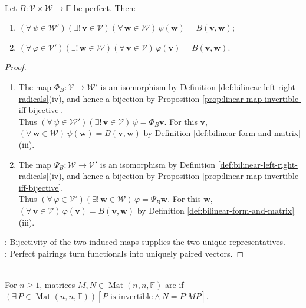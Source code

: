 \begin{corollary} \label{cor:perfect-pairing-represents-functionals} \\
Let $B:\mathcal{V}\times\mathcal{W}\to\mathbb{F}$ be perfect. Then:
\begin{enumerate}[label=(\roman*)]
\setlength{\itemsep}{0pt}
\item $(\forall\,\psi\in\mathcal{W}')(\exists!\,\mathbf{v}\in\mathcal{V})(\forall\,\mathbf{w}\in\mathcal{W})\,\psi(\mathbf{w})=B(\mathbf{v},\mathbf{w})$;
\item $(\forall\,\varphi\in\mathcal{V}')(\exists!\,\mathbf{w}\in\mathcal{W})(\forall\,\mathbf{v}\in\mathcal{V})\,\varphi(\mathbf{v})=B(\mathbf{v},\mathbf{w})$.
\end{enumerate}
\begin{proof}
\begin{enumerate}[label=(\roman*)]
\setlength{\itemsep}{0pt}
\item The map $\Phi_B:\mathcal{V}\to\mathcal{W}'$ is an isomorphism by Definition \ref{def:bilinear-left-right-radicals}(iv), and hence a bijection by Proposition \ref{prop:linear-map-invertible-iff-bijective}.\\
Thus $(\forall\,\psi\in\mathcal{W}')(\exists!\,\mathbf{v}\in\mathcal{V})\,\psi=\Phi_B\mathbf{v}$. For this $\mathbf{v}$, $(\forall\,\mathbf{w}\in\mathcal{W})\,\psi(\mathbf{w})=B(\mathbf{v},\mathbf{w})$ by Definition \ref{def:bilinear-form-and-matrix}(iii).
\item The map $\Psi_B:\mathcal{W}\to\mathcal{V}'$ is an isomorphism by Definition \ref{def:bilinear-left-right-radicals}(iv), and hence a bijection by Proposition \ref{prop:linear-map-invertible-iff-bijective}.\\
Thus $(\forall\,\varphi\in\mathcal{V}')(\exists!\,\mathbf{w}\in\mathcal{W})\,\varphi=\Psi_B\mathbf{w}$. For this $\mathbf{w}$, $(\forall\,\mathbf{v}\in\mathcal{V})\,\varphi(\mathbf{v})=B(\mathbf{v},\mathbf{w})$ by Definition \ref{def:bilinear-form-and-matrix}(iii).
\end{enumerate}
: Bijectivity of the two induced maps supplies the two unique representatives.\\
: Perfect pairings turn functionals into uniquely paired vectors.
\end{proof}
\end{corollary}

\begin{definition} \label{def:matrix-congruence} \\
For $n\geq1$, matrices $M,N\in\operatorname{Mat}(n,n,\mathbb{F})$ are  if $(\exists\,P\in\operatorname{Mat}(n,n,\mathbb{F}))[P\text{ is invertible}\land N=P^tMP]$.
\end{definition}

